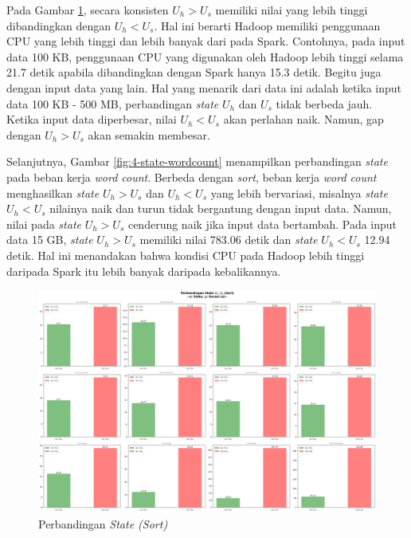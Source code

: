 Pada Gambar \ref{fig:4-state-sort}, secara konsisten $U_h > U_s$ memiliki nilai yang lebih tinggi dibandingkan dengan $U_h < U_s$. Hal ini berarti Hadoop memiliki penggunaan CPU yang lebih tinggi dan lebih banyak dari pada Spark. Contohnya, pada input data 100 KB, penggunaan CPU yang digunakan oleh Hadoop lebih tinggi selama 21.7 detik apabila dibandingkan dengan Spark hanya 15.3 detik. Begitu juga dengan input data yang lain. Hal yang menarik dari data ini adalah ketika input data 100 KB - 500 MB, perbandingan \textit{state} $U_h$ dan $U_s$ tidak berbeda jauh. Ketika input data diperbesar, nilai $U_h < U_s$ akan perlahan naik. Namun, gap dengan $U_h > U_s$ akan semakin membesar.

Selanjutnya, Gambar \ref{fig:4-state-wordcount} menampilkan perbandingan \textit{state} pada beban kerja \textit{word count}. Berbeda dengan \textit{sort}, beban kerja \textit{word count} menghasilkan \textit{state} $U_h > U_s$ dan $U_h < U_s$ yang lebih bervariasi, misalnya \textit{state} $U_h < U_s$ nilainya naik dan turun tidak bergantung dengan input data. Namun, nilai pada \textit{state} $U_h > U_s$ cenderung naik jika input data bertambah. Pada input data 15 GB, \textit{state} $U_h > U_s$ memiliki nilai 783.06 detik dan \textit{state} $U_h < U_s$ 12.94 detik. Hal ini menandakan bahwa kondisi CPU pada Hadoop lebih tinggi daripada Spark itu lebih banyak daripada kebalikannya. 

\begin{landscape}
\begin{figure}[h]
    \centering
    \includegraphics[height=0.6\linewidth]{figures/ch04/4-state-sort.png}
    \caption{Perbandingan \textit{State (Sort)}}
    \label{fig:4-state-sort}
\end{figure}
\end{landscape}

